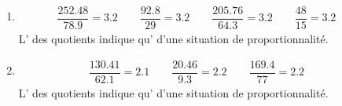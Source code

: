 {\begin{enumerate}
\item\begin{align*}
\dfrac{252.48}{78.9} = 3.2\qquad \dfrac{92.8}{29} = 3.2\qquad \dfrac{205.76}{64.3} = 3.2\qquad \dfrac{48}{15} = 3.2\qquad 
\end{align*}
L' des quotients indique qu' d'une situation de proportionnalité.

\item\begin{align*}
\dfrac{130.41}{62.1} = 2.1\qquad \dfrac{20.46}{9.3} = 2.2\qquad \dfrac{169.4}{77} = 2.2\qquad 
\end{align*}
L' des quotients indique qu' d'une situation de proportionnalité.

\end{enumerate}}